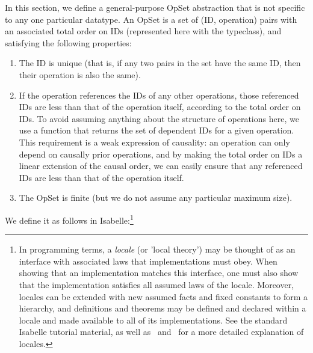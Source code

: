 In this section, we define a general-purpose OpSet abstraction that is not specific to any one particular datatype.
An OpSet is a set of (ID, operation) pairs with an associated total order on IDs (represented here with the  typeclass), and satisfying the following properties:
\begin{enumerate}
\item The ID is unique (that is, if any two pairs in the set have the same ID, then their operation is also the same).
\item If the operation references the IDs of any other operations, those referenced IDs are less than that of the operation itself, according to the total order on IDs.
To avoid assuming anything about the structure of operations here, we use a function  that returns the set of dependent IDs for a given operation.
This requirement is a weak expression of causality: an operation can only depend on causally prior operations, and by making the total order on IDs a linear extension of the causal order, we can easily ensure that any referenced IDs are less than that of the operation itself.
\item The OpSet is finite (but we do not assume any particular maximum size).
\end{enumerate}
We define it as follows in Isabelle:\footnote{In programming terms, a \emph{locale} (or 'local theory') may be thought of as an interface with associated laws that implementations must obey.
When showing that an implementation matches this interface, one must also show that the implementation satisfies all assumed laws of the locale.
Moreover, locales can be extended with new assumed facts and fixed constants to form a hierarchy, and definitions and theorems may be defined and declared within a locale and made available to all of its implementations.
See the standard Isabelle tutorial material, as well as~\cite{DBLP:conf/tphol/KammullerWP99} and~\cite{DBLP:conf/types/HaftmannW08} for a more detailed explanation of locales.}
